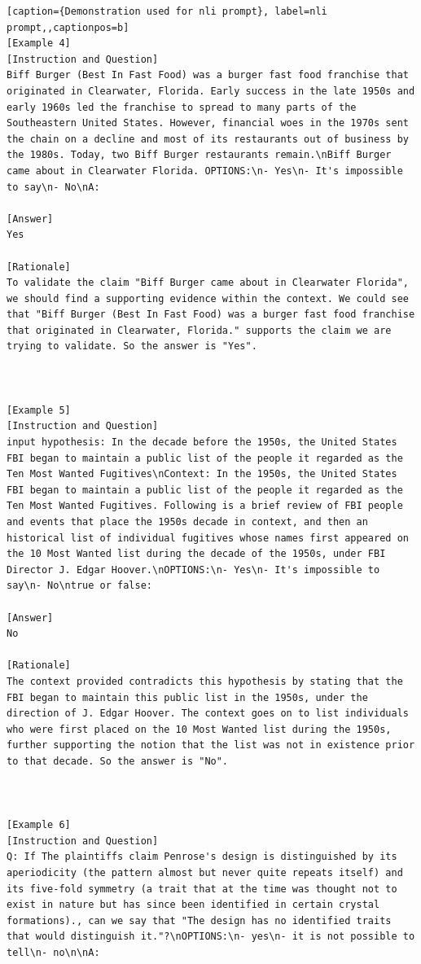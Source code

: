 \begin{lstlisting}[caption={Demonstration used for nli prompt}, label=nli prompt,,captionpos=b]
[Example 4]
[Instruction and Question]
Biff Burger (Best In Fast Food) was a burger fast food franchise that originated in Clearwater, Florida. Early success in the late 1950s and early 1960s led the franchise to spread to many parts of the Southeastern United States. However, financial woes in the 1970s sent the chain on a decline and most of its restaurants out of business by the 1980s. Today, two Biff Burger restaurants remain.\nBiff Burger came about in Clearwater Florida. OPTIONS:\n- Yes\n- It's impossible to say\n- No\nA: 

[Answer]
Yes

[Rationale]
To validate the claim "Biff Burger came about in Clearwater Florida", we should find a supporting evidence within the context. We could see that "Biff Burger (Best In Fast Food) was a burger fast food franchise that originated in Clearwater, Florida." supports the claim we are trying to validate. So the answer is "Yes".



[Example 5]
[Instruction and Question]
input hypothesis: In the decade before the 1950s, the United States FBI began to maintain a public list of the people it regarded as the Ten Most Wanted Fugitives\nContext: In the 1950s, the United States FBI began to maintain a public list of the people it regarded as the Ten Most Wanted Fugitives. Following is a brief review of FBI people and events that place the 1950s decade in context, and then an historical list of individual fugitives whose names first appeared on the 10 Most Wanted list during the decade of the 1950s, under FBI Director J. Edgar Hoover.\nOPTIONS:\n- Yes\n- It's impossible to say\n- No\ntrue or false: 

[Answer]
No

[Rationale]
The context provided contradicts this hypothesis by stating that the FBI began to maintain this public list in the 1950s, under the direction of J. Edgar Hoover. The context goes on to list individuals who were first placed on the 10 Most Wanted list during the 1950s, further supporting the notion that the list was not in existence prior to that decade. So the answer is "No".



[Example 6]
[Instruction and Question]
Q: If The plaintiffs claim Penrose's design is distinguished by its aperiodicity (the pattern almost but never quite repeats itself) and its five-fold symmetry (a trait that at the time was thought not to exist in nature but has since been identified in certain crystal formations)., can we say that "The design has no identified traits that would distinguish it."?\nOPTIONS:\n- yes\n- it is not possible to tell\n- no\n\nA: 


\end{lstlisting}

